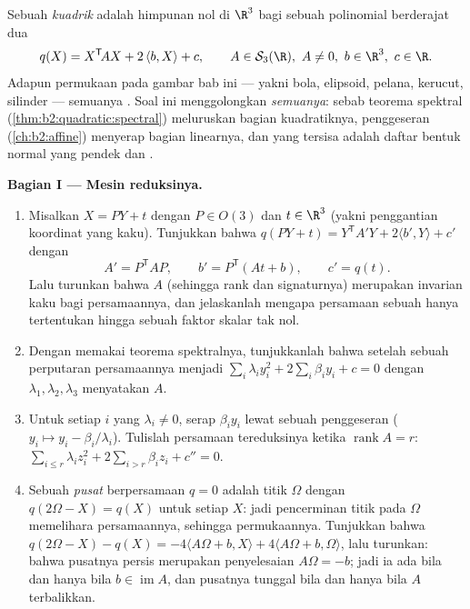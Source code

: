 \begin{problem}\label{pb:b2:surfaces:1}
Sebuah \emph{kuadrik} adalah himpunan nol di $\R^3$ bagi
sebuah polinomial berderajat dua
\[
q(X) = X^{\mathsf T}\!AX + 2\,\langle b, X\rangle + c,
\qquad A \in \mathcal S_3(\R),\ A \neq 0,\ b \in \R^3,\
c \in \R .
\]
Adapun permukaan pada gambar bab ini --- yakni bola,
elipsoid, pelana, kerucut, silinder --- semuanya .
Soal ini menggolongkan \emph{semuanya}: sebab teorema spektral
(\cref{thm:b2:quadratic:spectral}) meluruskan bagian
kuadratiknya, penggeseran  (\cref{ch:b2:affine}) menyerap
bagian linearnya, dan yang tersisa adalah daftar bentuk normal yang
pendek dan \omterm{def:b2:metric:complete}{lengkap}.

\medskip
\noindent\textbf{Bagian I --- Mesin reduksinya.}
\begin{enumerate}
  \item Misalkan $X = PY + t$ dengan $P \in O(3)$ dan $t \in \R^3$ (yakni
        penggantian koordinat yang kaku). Tunjukkan bahwa $q(PY + t) =
        Y^{\mathsf T}\!A'Y + 2\langle b', Y\rangle + c'$ dengan
        \[
        A' = P^{\mathsf T}\!AP, \qquad
        b' = P^{\mathsf T}(At + b), \qquad
        c' = q(t) .
        \]
        Lalu turunkan bahwa  $A$ (sehingga rank dan
        signaturnya) merupakan invarian kaku bagi persamaannya, dan
        jelaskanlah mengapa persamaan sebuah  hanya
        tertentukan hingga sebuah faktor skalar tak nol.
  \item Dengan memakai teorema spektralnya, tunjukkanlah bahwa setelah sebuah perputaran
        persamaannya menjadi $\sum_i \lambda_i y_i^2 +
        2\sum_i\beta_iy_i + c = 0$ dengan $\lambda_1, \lambda_2,
        \lambda_3$ menyatakan  $A$.
  \item Untuk setiap $i$ yang $\lambda_i \neq 0$, serap
        $\beta_iy_i$ lewat sebuah penggeseran ($y_i \mapsto y_i -
        \beta_i/\lambda_i$). Tulislah persamaan tereduksinya ketika
        $\operatorname{rank} A = r$: $\sum_{i\leq r}\lambda_i
        z_i^2 + 2\sum_{i > r}\beta_iz_i + c'' = 0$.
  \item Sebuah \emph{pusat}  berpersamaan $q = 0$ adalah
        titik $\Omega$ dengan $q(2\Omega - X) = q(X)$ untuk setiap
        $X$: jadi pencerminan titik pada $\Omega$ memelihara
        persamaannya, sehingga permukaannya. Tunjukkan bahwa $q(2\Omega - X)
        - q(X) = -4\langle A\Omega + b, X\rangle + 4\langle
        A\Omega + b, \Omega\rangle$, lalu turunkan: bahwa pusatnya
        persis merupakan penyelesaian $A\Omega = -b$; jadi ia
        ada bila dan hanya bila $b \in \operatorname{im}A$, dan pusatnya
        tunggal bila dan hanya bila $A$ terbalikkan.
\end{enumerate}


\end{problem}

